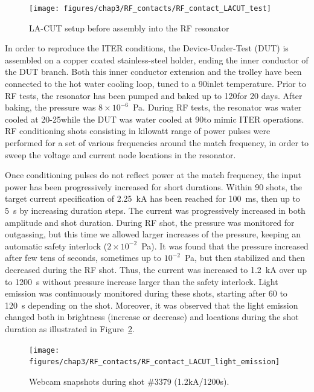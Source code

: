 {\begin{figure}
	\centering
	\texttt{[image: figures/chap3/RF\_contacts/RF\_contact\_LACUT\_test]}
	\caption{LA-CUT setup before assembly into the RF resonator}
	\label{fig:rfcontactlacuttest}
\end{figure}

In order to reproduce the ITER conditions, the Device-Under-Test (DUT) is assembled on a copper coated stainless-steel holder, ending the inner conductor of the DUT branch. Both this inner conductor extension and the trolley have been connected to the hot water cooling loop, tuned to a 90\degC inlet temperature. Prior to RF tests, the resonator has been pumped and baked up to 120\degC for 20 days. After baking, the pressure was $8\times10^{-6}$~Pa. During RF tests, the resonator was water cooled at 20-25\degC while the DUT was water cooled at 90\degC to mimic ITER operations. RF conditioning shots consisting in kilowatt range of power pulses were performed for a set of various frequencies around the match frequency, in order to sweep the voltage and current node locations in the resonator. 

Once conditioning pulses do not reflect power at the match frequency, the input power has been progressively increased for short durations. Within 90 shots, the target current specification of 2.25~kA has been reached for 100~ms, then up to 5~s by increasing duration steps. The current was progressively increased in both amplitude and shot duration. During RF shot, the pressure was monitored for outgassing, but this time we allowed larger increases of the pressure, keeping an automatic safety interlock ($2\times10^{-2}$~Pa). It was found that the pressure increased after few tens of seconds, sometimes up to $10^{-2}$~Pa, but then stabilized and then decreased during the RF shot. Thus, the current was increased to 1.2~kA over up to 1200~s without pressure increase larger than the safety interlock. Light emission was continuously monitored during these shots, starting after 60 to 120~s depending on the shot. Moreover, it was observed that the light emission changed both in brightness (increase or decrease) and locations during the shot duration as illustrated in Figure~\ref{fig:rfcontactlacutlightemission}.

\begin{figure}[h]
	\centering
	\texttt{[image: figures/chap3/RF\_contacts/RF\_contact\_LACUT\_light\_emission]}
	\caption{Webcam snapshots during shot \#3379 (1.2kA/1200s).}
	\label{fig:rfcontactlacutlightemission}
\end{figure}

}
